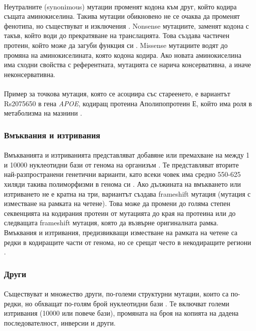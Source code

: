 \documentclass[pdftex,cyrillic,14pt,a4page,twoside,openright]{extreport}
\begin{document}
\paragraph{}
Неутралните (synonimous) мутации променят кодона към друг, който кодира същата аминокиселина. Такива мутации обикновено не се очаква да променят фенотипа, но съществуват и изключения \cite{kimchi2007}. Nonsense мутациите, заменят кодона с такъв, който води до прекратяване на транслацията. Това създава частичен протеин, който може да загуби функция си \cite{bidou2012}. Missense мутациите водят до промяна на аминокиселината, която кодона кодира. Ако новата аминокиселина има сходни свойства с референтната, мутацията се нарича консервативна, а иначе неконсервативна.

\paragraph{}
Пример за точкова мутация, която се асоциира със стареенето, е вариантът Rs2075650 в гена \textit{APOE}, кодиращ протеина Аполипопротеин Е, който има роля в метаболизма на мазнини \cite{deelen2011, lu2014}.

\subsubsection{Вмъквания и изтривания}
\paragraph{}
Вмъкванията и изтриванията представляват добавяне или премахване на между 1 и 10000 нуклеотидни бази от генома на организъм \cite{mullaney2010}. Те представляват вторите най-разпространени генетични варианти, като всеки човек има средно 550-625 хиляди такива полиморфизми в генома си \cite{auton2015}. Ако дължината на вмъкването или изтриването не е кратна на три, вариантът създава frameshift мутация (мутация с изместване на рамката на четене). Това може да промени до голяма степен секвенцията на кодирания протеин от мутацията до края на протеина или до следващата frameshift мутация, която да възвърне оригиналната рамка. Вмъквания и изтривания, предизвикващи изместване на рамката на четене са редки в кодиращите части от генома, но се срещат често в некодиращите региони \cite{bai2013}.

\subsubsection{Други}
\paragraph{}
Съществуват и множество други, по-големи структурни мутации, които са по-редки, но обхващат по-голям брой нуклеотидни бази \cite{auton2015}. Те включват големи изтривания (10000 или повече бази), промяната на броя на копията на дадена последователност, инверсии и други.
\end{document}
